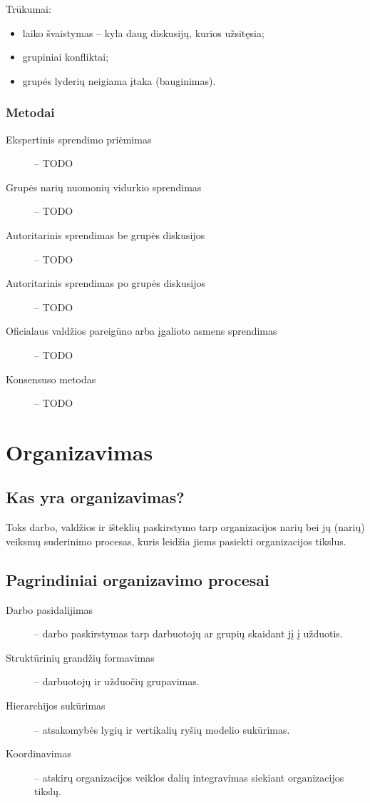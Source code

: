 Trūkumai:
\begin{itemize}
  \item laiko švaistymas – kyla daug diskusijų, kurios užsitęsia;
  \item grupiniai konfliktai;
  \item grupės lyderių neigiama įtaka (bauginimas).
\end{itemize}

\subsection{Metodai}

\begin{description}
  \item[Ekspertinis sprendimo priėmimas] – TODO
  \item[Grupės narių nuomonių vidurkio sprendimas] – TODO
  \item[Autoritarinis sprendimas be grupės diskusijos] – TODO
  \item[Autoritarinis sprendimas po grupės diskusijos] – TODO
  \item[Oficialaus valdžios pareigūno arba įgalioto asmens sprendimas] –
    TODO
  \item[Konsensuso metodas] – TODO
\end{description}

\chapter{Organizavimas}

\section{Kas yra organizavimas?}

\begin{defn}[Organizavimas]
  Toks darbo, valdžios ir išteklių paskirstymo tarp organizacijos
  narių bei jų (narių) veiksmų suderinimo procesas, kuris leidžia jiems
  pasiekti organizacijos tikslus.
\end{defn}

\section{Pagrindiniai organizavimo procesai}

\begin{description}
  \item[Darbo pasidalijimas] – darbo paskirstymas tarp darbuotojų ar
    grupių skaidant jį į užduotis.
  \item[Struktūrinių grandžių formavimas] – darbuotojų ir
    užduočių grupavimas.
  \item[Hierarchijos sukūrimas] – atsakomybės lygių ir vertikalių
    ryšių modelio sukūrimas.
  \item[Koordinavimas] – atskirų organizacijos veiklos dalių integravimas
    siekiant organizacijos tikslų.
\end{description}

